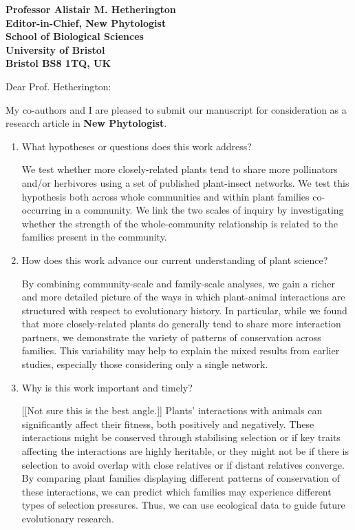 \documentclass[12pt]{letter}
\begin{document}
\begin{letter}{\bf Professor Alistair M. Hetherington\\
               Editor-in-Chief, New Phytologist\\
               School of Biological Sciences\\
               University of Bristol\\
               Bristol BS8 1TQ, UK
                               }


\opening{Dear Prof. Hetherington:}


	My co-authors and I are pleased to submit our manuscript for consideration as a research article in \textbf{New Phytologist}. 

	\begin{enumerate}

	\item What hypotheses or questions does this work address?
		\smallskip


		We test whether	more closely-related plants tend to share more pollinators and/or herbivores using a set of published plant-insect networks. We test this hypothesis both across whole communities and within plant families co-occurring in a community. We link the two scales of inquiry by investigating whether the strength of the whole-community relationship is related to the families present in the community.

		\smallskip


		\item How does this work advance our current understanding of plant science?
		\smallskip 


		By combining community-scale and family-scale analyses, we gain a richer and more detailed picture of the ways in which plant-animal interactions are structured with respect to evolutionary history. In particular, while we found that more closely-related plants do generally tend to share more interaction partners, we demonstrate the variety of patterns of conservation across families. This variability may help to explain the mixed results from earlier studies, especially those considering only a single network.

		\smallskip

	
		\item Why is this work important and timely?
		\smallskip


		[[Not sure this is the best angle.]]
		Plants' interactions with animals can significantly affect their fitness, both positively and negatively. These interactions might be conserved through stabilising selection or if key traits affecting the interactions are highly heritable, or they might not be if there is selection to avoid overlap with close relatives or if distant relatives converge. By comparing plant families displaying different patterns of conservation of these interactions, we can predict which families may experience different types of selection pressures. Thus, we can use ecological data to guide future evolutionary research.



\end{enumerate}
\end{letter}
\end{document}
